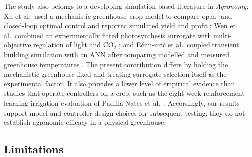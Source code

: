 The study also belongs to a developing simulation-based literature in
\textit{Agronomy}. Xu et al.\ used a mechanistic greenhouse--crop model to compare
open- and closed-loop optimal control and reported simulated yield and profit
\cite{xu2023agronomy}; Wen et al.\ combined an experimentally fitted photosynthesis
surrogate with multi-objective regulation of light and CO$_2$
\cite{wen2022agronomy}; and E{\'c}im-{\DJ}uri{\'c} et al.\ coupled transient building
simulation with an ANN after comparing modelled and measured greenhouse temperatures
\cite{ecimduric2024}. The present contribution differs by holding the mechanistic
greenhouse fixed and treating surrogate selection itself as the experimental factor. It
also provides a lower level of empirical evidence than studies that operate controllers
on a crop, such as the eight-week reinforcement-learning irrigation evaluation of
Padilla-Nates et al.\ \cite{padillanates2025}. Accordingly, our results support model and
controller design choices for subsequent testing; they do not establish agronomic efficacy
in a physical greenhouse.

\subsection{Limitations}
\label{sec:disc-limitations}

